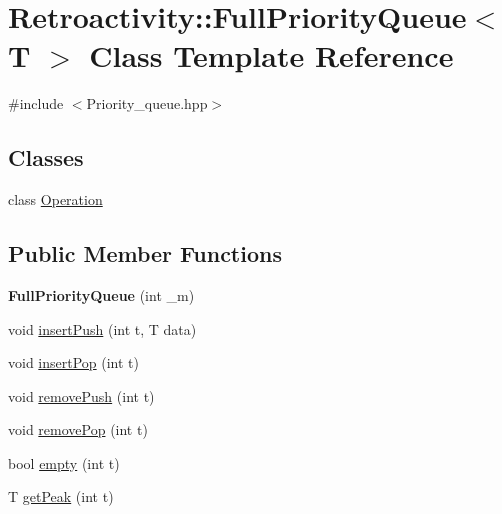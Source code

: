 \hypertarget{classRetroactivity_1_1FullPriorityQueue}{}\section{Retroactivity\+:\+:Full\+Priority\+Queue$<$ T $>$ Class Template Reference}
\label{classRetroactivity_1_1FullPriorityQueue}


{\ttfamily \#include $<$Priority\+\_\+queue.\+hpp$>$}

\subsection*{Classes}
\begin{DoxyCompactItemize}
\item 
class \hyperlink{classRetroactivity_1_1FullPriorityQueue_1_1Operation}{Operation}
\end{DoxyCompactItemize}
\subsection*{Public Member Functions}
\begin{DoxyCompactItemize}
\item 
\mbox{\label{classRetroactivity_1_1FullPriorityQueue_ab5b908f4c82280a50679d118966fcc9b}} 
{\bfseries Full\+Priority\+Queue} (int \+\_\+m)
\item 
void \hyperlink{classRetroactivity_1_1FullPriorityQueue_a8d6c51db7f1e58fe0faacca87281a480}{insert\+Push} (int t, T data)
\item 
void \hyperlink{classRetroactivity_1_1FullPriorityQueue_aeafc624a516c36a66a18ba5012866d14}{insert\+Pop} (int t)
\item 
void \hyperlink{classRetroactivity_1_1FullPriorityQueue_ae82e78f6ede64ae31fef741de01d77bb}{remove\+Push} (int t)
\item 
void \hyperlink{classRetroactivity_1_1FullPriorityQueue_ac0032e9ff6c2c9cbcd58acf1e359ee9f}{remove\+Pop} (int t)
\item 
bool \hyperlink{classRetroactivity_1_1FullPriorityQueue_a9e57d89b5a9a8eb5026cc9d02e1d91dc}{empty} (int t)
\item 
T \hyperlink{classRetroactivity_1_1FullPriorityQueue_a4dfffe327fe0f1077a2309f1b69ea392}{get\+Peak} (int t)
\end{DoxyCompactItemize}


